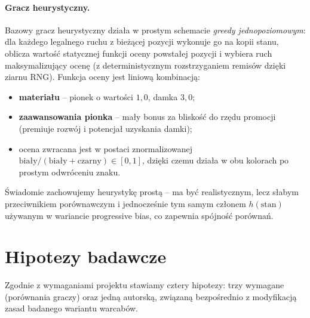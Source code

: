 \documentclass[11pt,a4paper]{article}
\begin{document}
\paragraph{Gracz heurystyczny.} Bazowy gracz heurystyczny działa w
prostym schemacie \emph{greedy jednopoziomowym}: dla każdego legalnego
ruchu z bieżącej pozycji wykonuje go na kopii stanu, oblicza wartość
statycznej funkcji oceny powstałej pozycji i wybiera ruch maksymalizujący
ocenę (z deterministycznym rozstrzyganiem remisów dzięki ziarnu RNG).
Funkcja oceny jest liniową kombinacją:
\begin{itemize}[noitemsep]
    \item \textbf{materiału} -- pionek o wartości $1{,}0$, damka
        $3{,}0$;
    \item \textbf{zaawansowania pionka} -- mały bonus za bliskość do
        rzędu promocji (premiuje rozwój i potencjał uzyskania damki);
    \item ocena zwracana jest w postaci znormalizowanej
        $\text{biały}/(\text{biały}+\text{czarny}) \in [0,1]$, dzięki
        czemu działa w obu kolorach po prostym odwróceniu znaku.
\end{itemize}
Świadomie zachowujemy heurystykę prostą -- ma być realistycznym, lecz
słabym przeciwnikiem porównawczym i jednocześnie tym samym członem
$h(\text{stan})$ używanym w wariancie progressive bias, co zapewnia
spójność porównań.

\section{Hipotezy badawcze}

Zgodnie z wymaganiami projektu stawiamy cztery hipotezy: trzy
wymagane (porównania graczy) oraz jedną autorską, związaną
bezpośrednio z modyfikacją zasad badanego wariantu warcabów.
\end{document}
